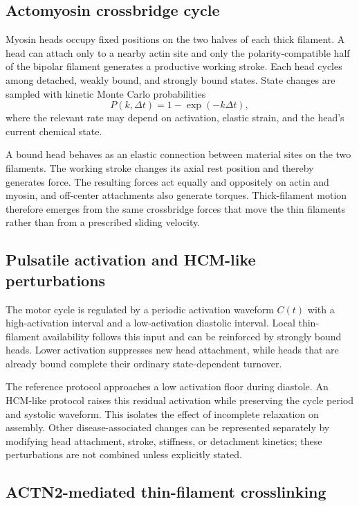 \documentclass[11pt]{article}
\begin{document}
\subsection{Actomyosin crossbridge cycle}

Myosin heads occupy fixed positions on the two halves of each thick filament.
A head can attach only to a nearby actin site and only the polarity-compatible
half of the bipolar filament generates a productive working stroke. Each head
cycles among detached, weakly bound, and strongly bound states. State changes
are sampled with kinetic Monte Carlo probabilities
\begin{equation}
  P(k,\Delta t)=1-\exp(-k\Delta t),
\end{equation}
where the relevant rate may depend on activation, elastic strain, and the
head's current chemical state.

A bound head behaves as an elastic connection between material sites on the
two filaments. The working stroke changes its axial rest position and thereby
generates force. The resulting forces act equally and oppositely on actin and
myosin, and off-center attachments also generate torques. Thick-filament
motion therefore emerges from the same crossbridge forces that move the thin
filaments rather than from a prescribed sliding velocity.


\subsection{Pulsatile activation and HCM-like perturbations}

The motor cycle is regulated by a periodic activation waveform $C(t)$ with a
high-activation interval and a low-activation diastolic interval. Local thin-
filament availability follows this input and can be reinforced by strongly
bound heads. Lower activation suppresses new head attachment, while heads
that are already bound complete their ordinary state-dependent turnover.

The reference protocol approaches a low activation floor during diastole. An
HCM-like protocol raises this residual activation while preserving the cycle
period and systolic waveform. This isolates the effect of incomplete
relaxation on assembly. Other disease-associated changes can be represented
separately by modifying head attachment, stroke, stiffness, or detachment
kinetics; these perturbations are not combined unless explicitly stated.


\subsection{ACTN2-mediated thin-filament crosslinking}
\end{document}
